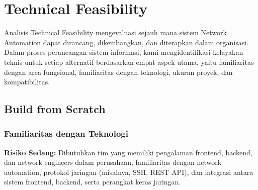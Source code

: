 

\section{Technical Feasibility}

Analisis Technical Feasibility mengevaluasi sejauh mana sistem Network Automation dapat dirancang, dikembangkan, dan diterapkan dalam organisasi. Dalam proses perancangan sistem informasi, kami mengidentifikasi kelayakan teknis untuk setiap alternatif berdasarkan empat aspek utama, yaitu familiaritas dengan area fungsional, familiaritas dengan teknologi, ukuran proyek, dan kompatibilitas.

\subsection{Build from Scratch}

\subsubsection{Familiaritas dengan Teknologi}

\textbf{Risiko Sedang:} Dibutuhkan tim yang memiliki pengalaman frontend, backend, dan network engineers dalam perusahaan, familiaritas dengan network automation, protokol jaringan (misalnya, SSH, REST API), dan integrasi antara sistem frontend, backend, serta perangkat keras jaringan.

